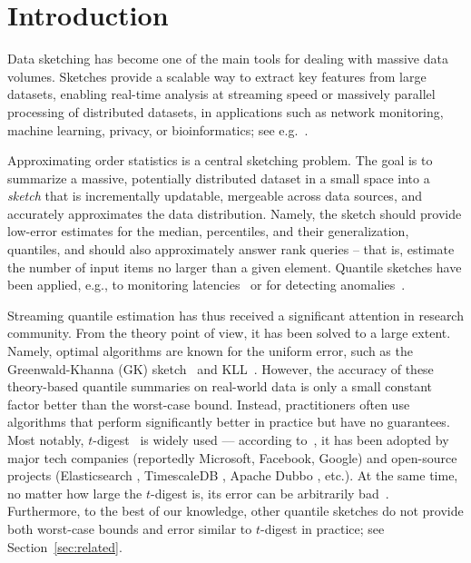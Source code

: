 \documentclass[acmsmall]{acmart}
\theoremstyle{remark}
\begin{document}
\section{Introduction}

Data sketching has become one of the main tools for dealing with massive data volumes. %
Sketches provide a scalable way to extract key features from large datasets, enabling
real-time analysis at streaming speed or massively parallel processing of distributed datasets, in applications such as network monitoring, machine learning, privacy, or bioinformatics; see %
e.g.~\cite{SifferFTL17,cormodeY20,Cormode21a,RothchildPUISB020,Smith0T20,PaghS21,baker2023genomic,bonnie2024dandd,ClemensSGH23}.

Approximating order statistics %
is a central sketching problem. %
The goal is to summarize a massive, potentially distributed dataset in a small space into a \emph{sketch} that is incrementally updatable, mergeable across data sources, and accurately approximates the data distribution.
Namely, the sketch should provide low-error estimates for the median, percentiles, and their generalization, quantiles,
and should also approximately answer rank queries -- that is, estimate the number of input items no larger than a given element.
Quantile sketches have been applied, e.g., to monitoring latencies~\cite{tene2015_latency_talk}
or for detecting anomalies~\cite{SifferFTL17}.

Streaming quantile estimation has thus received a significant attention in research community.
From the theory point of view, it has been solved to a large extent. Namely, optimal algorithms are known for the uniform error, such as the Greenwald-Khanna (GK) sketch~\cite{greenwald2001space,CormodeV20} and KLL~\cite{KarninLL16}.
However, the accuracy of these theory-based quantile summaries %
on real-world data is only a small constant factor better than the worst-case bound.
Instead, practitioners often use algorithms that perform significantly better in practice but have no guarantees.
Most notably, $t$-digest~\cite{dunning19-t-digest} is widely used --- according to~\cite{dunning21}, it has been adopted by major tech companies (reportedly Microsoft, Facebook, Google) and open-source projects (Elasticsearch \cite{::elasticdocs}, TimescaleDB \cite{::tigerdatadocumentation}, Apache Dubbo \cite{::apachedubbodocumentation}, etc.).
At the same time, no matter how large the $t$-digest is, its error can be arbitrarily bad~\cite{CormodeMRV21}.
Furthermore, to the best of our knowledge, other quantile sketches do not provide both worst-case bounds and error similar to $t$-digest in practice; see Section~\ref{sec:related}.
\end{document}
